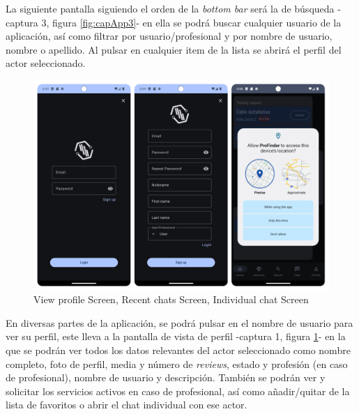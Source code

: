La siguiente pantalla siguiendo el orden de la \textit{bottom bar} será la de búsqueda -captura 3, figura \ref{fig:capApp3}- en ella se podrá buscar cualquier usuario de la aplicación, así como filtrar por usuario/profesional y por nombre de usuario, nombre o apellido. Al pulsar en cualquier item de la lista se abrirá el perfil del actor seleccionado.
\newpage
\begin{figure}[h]
	\centering
	\includegraphics[width = 1\textwidth]{Imagenes/capturasApp/login_signup_local.png}
	\caption{View profile Screen, Recent chats Screen, Individual chat Screen}
	\label{fig:capApp4}
\end{figure}

En diversas partes de la aplicación, se podrá pulsar en el  nombre de usuario para ver su perfil, este lleva a la pantalla de  vista de perfil -captura 1, figura \ref{fig:capApp4}- en la que se podrán ver todos los datos relevantes del actor seleccionado como nombre completo, foto de perfil, media y número de \textit{reviews}, estado y profesión (en caso de profesional), nombre de usuario y descripción. También se podrán ver y solicitar los servicios activos en caso de profesional, así como añadir/quitar de la lista de favoritos o abrir el chat individual con ese actor. 

